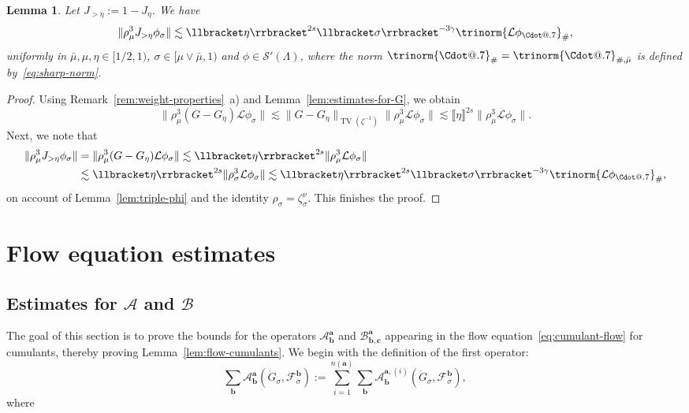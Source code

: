 \documentclass{article}
\makeatletter
\numberwithin{equation}{section}
\newcommand{\assign}{:=}
\newcommand*\Cdot{{\mathpalette\Cdot@{.7}}}
\newcommand*\Cdot@[2]{\mathbin{\vcenter{\hbox{\scalebox{#2}{\hspace{0.1mm}$\m@th#1\bullet$\hspace{0.1mm}}}}}}
\theoremstyle{plain}
\newtheorem{lemma}[theorem]{Lemma}
\theoremstyle{definition}
\makeatother
\begin{document}
\begin{lemma}
  \label{lem:schauder-two}Let $J_{> \eta} \assign 1 - J_{\eta}$. We have
  \[ \| \rho_{\mu}^3 J_{> \eta} \phi_{\sigma} \| \lesssim \llbracket \eta
     \rrbracket^{2 s}  \llbracket \sigma \rrbracket^{- 3 \gamma}  \trinorm{
     \mathcal{L} \phi_{\Cdot} }_{\#}, \]
  uniformly in $\bar{\mu}, \mu, \eta \in [1 / 2, 1)$, $\sigma \in [\mu \vee
  \bar{\mu}, 1)$ and $\phi \in \mathcal{S}' (\Lambda)$, where the norm
  $\trinorm{ \Cdot }_{\#} = \trinorm{ \Cdot
  }_{\#, \bar{\mu}}$ is defined by~\eqref{eq:sharp-norm}.
\end{lemma}

\begin{proof}
  Using Remark~\ref{rem:weight-properties}~a) and
  Lemma~\ref{lem:estimates-for-G}, we obtain
  \[ \| \rho_{\mu}^3  (G - G_{\eta}) \mathcal{L} \phi_{\sigma} \| \lesssim \|
     G - G_{\eta} \|_{\operatorname{TV} (\zeta^{- 1})}  \| \rho_{\mu}^3 \mathcal{L}
     \phi_{\sigma} \| \lesssim \llbracket \eta \rrbracket^{2 s}  \|
     \rho_{\mu}^3 \mathcal{L} \phi_{\sigma} \| . \]
  Next, we note that
  \begin{align*}
     \| \rho_{\mu}^3 J_{> \eta} \phi_{\sigma} \|
     &= \| \rho_{\mu}^3  (G - G_{\eta})
     \mathcal{L} \phi_{\sigma} \|
     \lesssim \llbracket \eta \rrbracket^{2 s}
     \| \rho_{\mu}^3 \mathcal{L} \phi_{\sigma} \|\\
     &\lesssim
     \llbracket \eta \rrbracket^{2 s} \| \rho_{\sigma}^3
     \mathcal{L} \phi_{\sigma} \|
     \lesssim \llbracket \eta \rrbracket^{2 s}
     \llbracket \sigma \rrbracket^{- 3 \gamma}
     \trinorm{ \mathcal{L} \phi_{\Cdot} }_{\#},
  \end{align*}
  on account of Lemma~\ref{lem:triple-phi} and the identity $\rho_{\sigma} =
  \zeta_{\sigma}^{\nu}$. This finishes the proof.
\end{proof}

\section{Flow equation estimates}\label{app:flow-eq}

\subsection{Estimates for \texorpdfstring{$\mathcal{A}$ and
$\mathcal{B}$}{A and B}}\label{sec:A-B-cumulants}

The goal of this section is to prove the bounds for the operators
{\textsf{$\mathcal{A}^{\boldsymbol{a}}_{\boldsymbol{b}}$}} and
$\mathcal{B}^{\boldsymbol{a}}_{\boldsymbol{b}, \boldsymbol{c}}$ appearing in the
flow equation~\eqref{eq:cumulant-flow} for cumulants, thereby proving
Lemma~\ref{lem:flow-cumulants}. We begin with the definition of the first
operator:
\[ \sum_{\boldsymbol{b}} \mathcal{A}^{\boldsymbol{a}}_{\boldsymbol{b}}
   (\dot{G}_{\sigma}, \mathcal{F}^{\boldsymbol{b}}_{\sigma}) \assign \sum_{i =
   1}^{n (\boldsymbol{a})} \sum_{\boldsymbol{b}} \mathcal{A}^{\boldsymbol{a},
   (i)}_{\boldsymbol{b}} (\dot{G}_{\sigma},
   \mathcal{F}^{\boldsymbol{b}}_{\sigma}), \]
where
\end{document}
